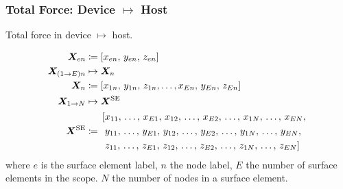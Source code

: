 \subsubsection{Total Force: Device $ \mapsto $ Host}
\begin{algorithm}
	\caption{Total force in device $ \mapsto $ host.}
	\begin{algorithmic}[1]
		 
		 
		 
		\EndFor
		\EndFor
		\EndFunction
	\end{algorithmic}
\end{algorithm}
\begin{subequations}\label{eq:fcne}
	\begin{align}
		\vec{X}_{en}          & \coloneqq	\left[x_{en},\, y_{en},\, z_{en}\right]                                                     \\
		\vec{X}_{(1\to E)n}   & \mapsto 	\vec{X}_{n} \nn
		\vec{X}_{n}           & \coloneqq	\left[x_{1n},\, y_{1n},\, z_{1n},\ldots,x_{En},\, y_{En},\, z_{En}\right]\label{seq:xn_arr} \\
		\vec{X}_{1\to N}      & \mapsto	\vec{X}^{\textrm{SE}}\nn
		\vec{X}^{\textrm{SE}} & \coloneqq
		\begin{aligned}
			 & \left[x_{11},\, \ldots,\, x_{E1},\, x_{12},\, \ldots,\, x_{E2},\, \ldots,\, x_{1N},\, \ldots,\, x_{EN}, \right.   \\
			 & \left.\,y_{11},\, \ldots,\, y_{E1},\, y_{12},\, \ldots,\, y_{E2},\, \ldots,\, y_{1N},\, \ldots,\, y_{EN}, \right. \\
			 & \left.\,z_{11},\, \ldots,\, z_{E1},\, z_{12},\, \ldots,\, z_{E2},\, \ldots,\, z_{1N},\, \ldots,\, z_{EN}  \right]
		\end{aligned}
	\end{align}
\end{subequations}
where $ e $ is the surface element label, $ n $ the node label, $ E $ the number of surface elements in the scope. $ N $ the number of nodes in a surface element.

